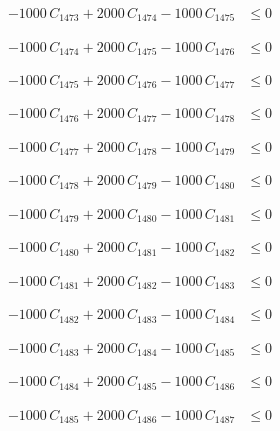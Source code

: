 \documentclass[a4paper,11pt]{article}
\begin{document}
\begin{align}
-1000\,C_{1473} + 2000\,C_{1474} - 1000\,C_{1475} &\leq 0 \nonumber
\end{align}

\begin{align}
-1000\,C_{1474} + 2000\,C_{1475} - 1000\,C_{1476} &\leq 0 \nonumber
\end{align}

\begin{align}
-1000\,C_{1475} + 2000\,C_{1476} - 1000\,C_{1477} &\leq 0 \nonumber
\end{align}

\begin{align}
-1000\,C_{1476} + 2000\,C_{1477} - 1000\,C_{1478} &\leq 0 \nonumber
\end{align}

\begin{align}
-1000\,C_{1477} + 2000\,C_{1478} - 1000\,C_{1479} &\leq 0 \nonumber
\end{align}

\begin{align}
-1000\,C_{1478} + 2000\,C_{1479} - 1000\,C_{1480} &\leq 0 \nonumber
\end{align}

\begin{align}
-1000\,C_{1479} + 2000\,C_{1480} - 1000\,C_{1481} &\leq 0 \nonumber
\end{align}

\begin{align}
-1000\,C_{1480} + 2000\,C_{1481} - 1000\,C_{1482} &\leq 0 \nonumber
\end{align}

\begin{align}
-1000\,C_{1481} + 2000\,C_{1482} - 1000\,C_{1483} &\leq 0 \nonumber
\end{align}

\begin{align}
-1000\,C_{1482} + 2000\,C_{1483} - 1000\,C_{1484} &\leq 0 \nonumber
\end{align}

\begin{align}
-1000\,C_{1483} + 2000\,C_{1484} - 1000\,C_{1485} &\leq 0 \nonumber
\end{align}

\begin{align}
-1000\,C_{1484} + 2000\,C_{1485} - 1000\,C_{1486} &\leq 0 \nonumber
\end{align}

\begin{align}
-1000\,C_{1485} + 2000\,C_{1486} - 1000\,C_{1487} &\leq 0 \nonumber
\end{align}
\end{document}
